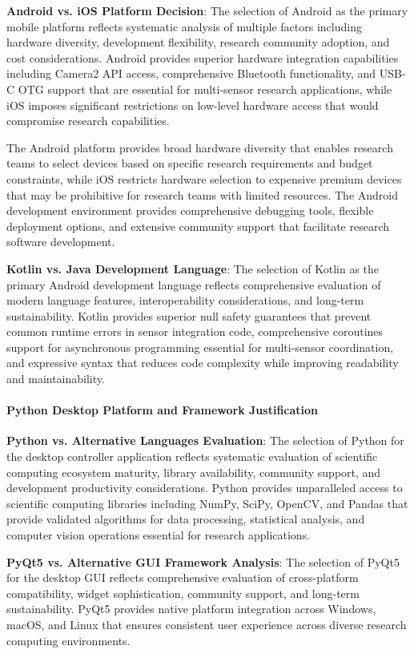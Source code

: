 \documentclass[12pt,a4paper]{report}
\begin{document}
\textbf{Android vs. iOS Platform Decision}: The selection of Android as the primary mobile platform reflects systematic
analysis of multiple factors including hardware diversity, development flexibility, research community adoption, and
cost considerations. Android provides superior hardware integration capabilities including Camera2 API access,
comprehensive Bluetooth functionality, and USB-C OTG support that are essential for multi-sensor research applications,
while iOS imposes significant restrictions on low-level hardware access that would compromise research capabilities.

The Android platform provides broad hardware diversity that enables research teams to select devices based on specific
research requirements and budget constraints, while iOS restricts hardware selection to expensive premium devices that
may be prohibitive for research teams with limited resources. The Android development environment provides comprehensive
debugging tools, flexible deployment options, and extensive community support that facilitate research software
development.

\textbf{Kotlin vs. Java Development Language}: The selection of Kotlin as the primary Android development language reflects
comprehensive evaluation of modern language features, interoperability considerations, and long-term sustainability.
Kotlin provides superior null safety guarantees that prevent common runtime errors in sensor integration code,
comprehensive coroutines support for asynchronous programming essential for multi-sensor coordination, and expressive
syntax that reduces code complexity while improving readability and maintainability.

\paragraph{Python Desktop Platform and Framework Justification}

\textbf{Python vs. Alternative Languages Evaluation}: The selection of Python for the desktop controller application reflects
systematic evaluation of scientific computing ecosystem maturity, library availability, community support, and
development productivity considerations. Python provides unparalleled access to scientific computing libraries including
NumPy, SciPy, OpenCV, and Pandas that provide validated algorithms for data processing, statistical analysis, and
computer vision operations essential for research applications.

\textbf{PyQt5 vs. Alternative GUI Framework Analysis}: The selection of PyQt5 for the desktop GUI reflects comprehensive
evaluation of cross-platform compatibility, widget sophistication, community support, and long-term sustainability.
PyQt5 provides native platform integration across Windows, macOS, and Linux that ensures consistent user experience
across diverse research computing environments.
\end{document}
